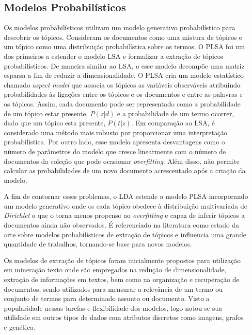 

\subsection{Modelos Probabilísticos}

Os modelos probabilísticos utilizam um modelo generativo probabilístico para descobrir os tópicos. Consideram os documentos como uma mistura de tópicos e um tópico como uma distribuição probabilística sobre os termos.
O PLSA foi um dos primeiros a estender o modelo LSA e formalizar a extração de tópicos probabilísticos. De maneira similar ao LSA, o esse modelo decompõe uma matriz esparsa a fim de reduzir a dimensionalidade. O PLSA cria um modelo estatístico chamado \textit{aspect model} que associa os tópicos as variáveis observáveis atribuindo probabilidades às ligações entre os tópicos e os documentos e entre as palavras e os tópicos. Assim, cada documento pode ser representado como a probabilidade de um tópico estar presente, $P(z|d)$ e a probabilidade de um termo ocorrer, dado que um tópico esta presente, $P(t|z)$. Em comparação ao LSA, é considerado uma método mais robusto por proporcionar uma interpretação probabilística. Por outro lado, esse modelo apresenta desvantagens como o número de parâmetros do modelo que cresce linearmente com o número de documentos da coleção que pode ocasionar \textit{overfitting}. Além disso, não permite calcular as probabilidades de um novo documento acrescentado após a criação da modelo.  %


A fim de contornar esses problemas, o LDA estende o modelo PLSA incorporando um modelo generativo onde os cada tópico obedece à distribuição multivariada de \textit{Dirichlet} o que o torna menos propenso ao \textit{overfitting} e capaz de inferir tópicos a documentos ainda não observados. É referenciado na literatura como estado da arte sobre modelos probabilísticos de extração de tópicos e influencia uma grande quantidade de trabalhos, tornando-se base para novos modelos.

Os modelos de extração de tópicos foram inicialmente propostos para utilização em mineração texto onde são empregados na redução de dimensionalidade, extração de informações em textos, bem como na organização e recuperação de documentos, sendo utilizados para mensurar a relevância de um termo ou conjunto de termos para determinado assunto ou documento. Visto a popularidade nessas tarefas e flexibilidade dos modelos, logo notou-se sua utilidade em outros tipos de dados com atributos discretos como imagens, grafos e genética. 



























